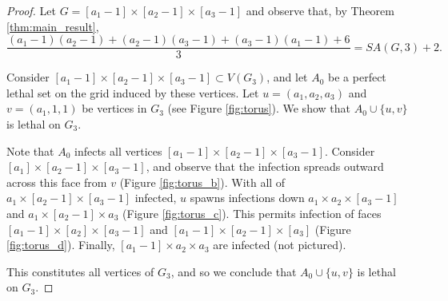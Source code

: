 \begin{proof}
Let $G = [a_1-1] \times [a_2-1] \times [a_3-1]$ and observe that, by Theorem \ref{thm:main_result},
$$\frac{(a_1-1)(a_2-1) + (a_2-1)(a_3-1) + (a_3-1)(a_1 -1) + 6}{3} = SA(G,3) + 2.$$

Consider $[a_1-1] \times [a_2-1] \times [a_3-1] \subset V(G_3)$, and let $A_0$ be a perfect lethal set on the grid induced by these vertices. Let $u = (a_1,a_2,a_3)$ and $v = (a_1,1,1)$ be vertices in $G_3$ (see Figure \ref{fig:torus}). We show that $A_0 \cup \{u,v\}$ is lethal on $G_3$. 

Note that $A_0$ infects all vertices $[a_1-1] \times [a_2-1] \times [a_3-1]$. Consider $[a_1] \times [a_2-1] \times [a_3-1]$, and observe that the infection spreads outward across this face from $v$ (Figure \ref{fig:torus_b}). With all of $a_1 \times [a_2-1] \times [a_3-1]$ infected, $u$ spawns infections down $a_1 \times a_2 \times [a_3-1]$ and $a_1 \times [a_2-1] \times a_3$ (Figure \ref{fig:torus_c}). This permits infection of faces $[a_1-1] \times [a_2] \times [a_3-1]$ and $[a_1-1] \times [a_2-1] \times [a_3]$ (Figure \ref{fig:torus_d}). Finally, $[a_1-1] \times a_2 \times a_3$ are infected (not pictured).

This constitutes all vertices of $G_3$, and so we conclude that $A_0 \cup \{u,v\}$ is lethal on $G_3$. 
\end{proof}


